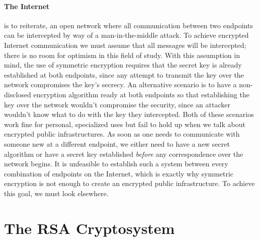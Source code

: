 \documentclass[12pt]{article}
\begin{document}
\paragraph{The Internet} is to reiterate, an open network where all communication between two endpoints can be intercepted by way of a man-in-the-middle attack.  To achieve encrypted Internet communication we must assume that all messages will be intercepted; there is no room for optimism in this field of study.  With this assumption in mind, the use of symmetric encryption requires that the secret key is already established at both endpoints, since any attempt to transmit the key over the network compromises the key's secrecy.  An alternative scenario is to have a non-disclosed encryption algorithm ready at both endpoints so that establishing the key over the network wouldn't compromise the security, since an attacker wouldn't know what to do with the key they intercepted.  Both of these scenarios work fine for personal, specialized uses but fail to hold up when we talk about encrypted public infrastructures.  As soon as one needs to communicate with someone new at a different endpoint, we either need to have a new secret algorithm or have a secret key established \textit{before} any correspondence over the network begins.  It is unfeasible to establish such a system between every combination of endpoints on the Internet, which is exactly why symmetric encryption is not enough to create an encrypted public infrastructure.  To achieve this goal, we must look elsewhere.



\section{The RSA Cryptosystem}
\end{document}
